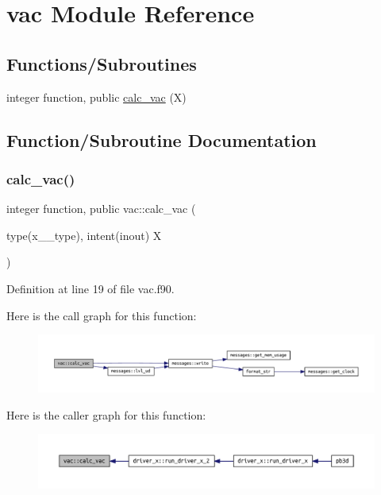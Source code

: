 \hypertarget{namespacevac}{}\section{vac Module Reference}
\label{namespacevac}
\subsection*{Functions/\+Subroutines}
\begin{DoxyCompactItemize}
\item 
integer function, public \hyperlink{namespacevac_a1a1c56e4a52cb5e3f3ee1e307e374c26}{calc\+\_\+vac} (X)
\end{DoxyCompactItemize}


\subsection{Function/\+Subroutine Documentation}
\mbox{\label{namespacevac_a1a1c56e4a52cb5e3f3ee1e307e374c26}} 
\subsubsection{\texorpdfstring{calc\+\_\+vac()}{calc\_vac()}}
{\footnotesize\ttfamily integer function, public vac\+::calc\+\_\+vac (\begin{DoxyParamCaption}\item[{type(x\+\_\+2\+\_\+type), intent(inout)}]{X }\end{DoxyParamCaption})}



Definition at line 19 of file vac.\+f90.

Here is the call graph for this function\+:
\nopagebreak
\begin{figure}[H]
\begin{center}
\leavevmode
\includegraphics[width=350pt]{namespacevac_a1a1c56e4a52cb5e3f3ee1e307e374c26_cgraph}
\end{center}
\end{figure}
Here is the caller graph for this function\+:
\nopagebreak
\begin{figure}[H]
\begin{center}
\leavevmode
\includegraphics[width=350pt]{namespacevac_a1a1c56e4a52cb5e3f3ee1e307e374c26_icgraph}
\end{center}
\end{figure}
